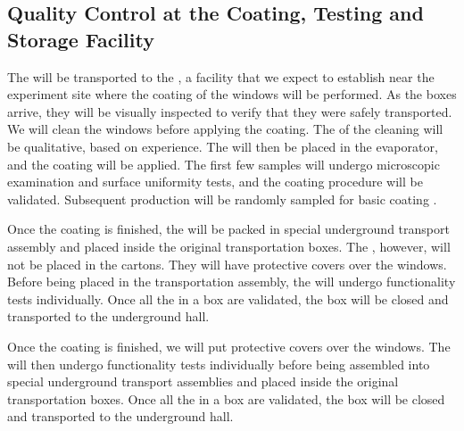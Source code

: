 \subsection{Quality Control at the Coating, Testing and Storage Facility}

The  will be transported to the , a facility that we expect to establish %
near the experiment site where the  coating of the  windows will be performed. As the  boxes arrive, %
they will be visually inspected to verify that they were safely transported. %
We will clean the  windows %
before applying the coating. %
The  of the cleaning will be qualitative, based on experience. The  will then be placed in the evaporator, and the coating will be applied. The first few samples will undergo microscopic examination and surface uniformity tests, and the coating procedure will be validated. Subsequent production  will be randomly sampled for basic coating .

Once the coating is finished, the  will be packed in special underground transport assembly and placed inside the original transportation boxes. The , however, will not be placed in the cartons. They will have protective covers over the windows. Before being placed in the transportation assembly, the  will undergo functionality tests individually. Once all the  in a box are validated, the box will be closed and transported to the underground hall. 

Once the coating is finished, we will put protective covers over the  windows. The   will then undergo functionality tests individually before being assembled into  special underground transport assemblies and placed inside the original transportation boxes.  Once all the  in a box are validated, the box will be closed and transported to the underground hall. 

